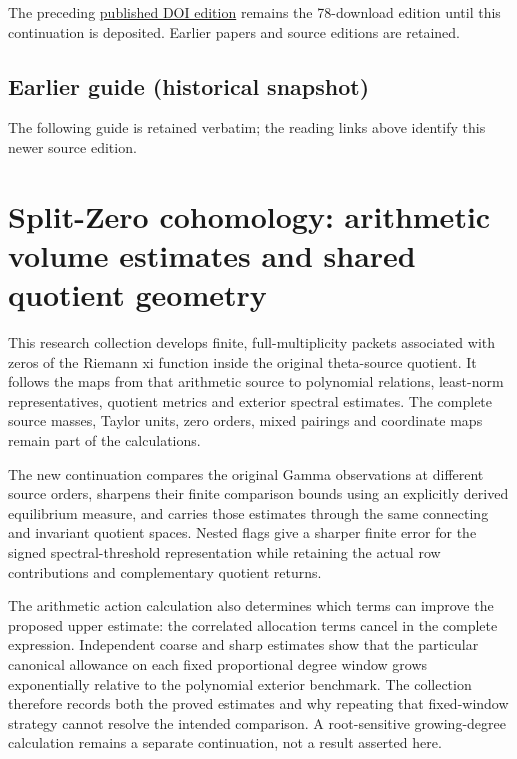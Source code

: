 \documentclass[
]{article}
\begin{document}
The preceding \href{https://zenodo.org/records/22802593}{published DOI
edition} remains the 78-download edition until this continuation is
deposited. Earlier papers and source editions are retained.

\subsection{Earlier guide (historical
snapshot)}\label{earlier-guide-historical-snapshot-8}

The following guide is retained verbatim; the reading links above
identify this newer source edition.

\section{Split-Zero cohomology: arithmetic volume estimates and shared
quotient
geometry}\label{split-zero-cohomology-arithmetic-volume-estimates-and-shared-quotient-geometry}

This research collection develops finite, full-multiplicity packets
associated with zeros of the Riemann xi function inside the original
theta-source quotient. It follows the maps from that arithmetic source
to polynomial relations, least-norm representatives, quotient metrics
and exterior spectral estimates. The complete source masses, Taylor
units, zero orders, mixed pairings and coordinate maps remain part of
the calculations.

The new continuation compares the original Gamma observations at
different source orders, sharpens their finite comparison bounds using
an explicitly derived equilibrium measure, and carries those estimates
through the same connecting and invariant quotient spaces. Nested flags
give a sharper finite error for the signed spectral-threshold
representation while retaining the actual row contributions and
complementary quotient returns.

The arithmetic action calculation also determines which terms can
improve the proposed upper estimate: the correlated allocation terms
cancel in the complete expression. Independent coarse and sharp
estimates show that the particular canonical allowance on each fixed
proportional degree window grows exponentially relative to the
polynomial exterior benchmark. The collection therefore records both the
proved estimates and why repeating that fixed-window strategy cannot
resolve the intended comparison. A root-sensitive growing-degree
calculation remains a separate continuation, not a result asserted here.
\end{document}

